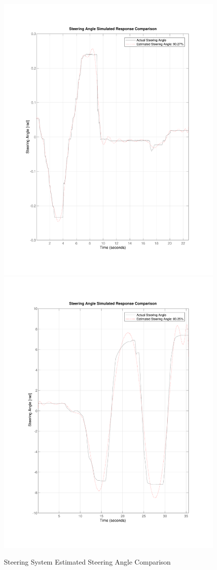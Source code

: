 \documentclass[journal,twoside,web]{ieeecolor}
\begin{document}
\begin{figure}[h]
	\centering
		{\includegraphics[width=0.48\linewidth]{figs/img/byWireSteeringTransferFunctionModel}}
		{\includegraphics[width=0.48\linewidth]{figs/img/manualSteeringTransferFunctionModel}}
	\caption{Steering System Estimated Steering Angle Comparison}
\end{figure}
\end{document}
